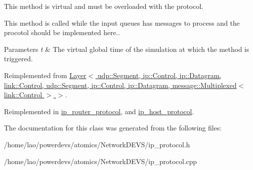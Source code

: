 This method is virtual and must be overloaded with the protocol. 

This method is called while the input queues has messages to process and the procotol should be implemented here..


\begin{DoxyParams}{Parameters}
{\em t} & The virtual global time of the simulation at which the method is triggered. \\
\hline
\end{DoxyParams}


Reimplemented from \hyperlink{classLayer_a1c82b14ba3efc37969f55c633a9b3173}{Layer$<$ udp\+::\+Segment, ip\+::\+Control, ip\+::\+Datagram, link\+::\+Control, udp\+::\+Segment, ip\+::\+Control, ip\+::\+Datagram, message\+::\+Multiplexed$<$ link\+::\+Control $>$ $>$}.



Reimplemented in \hyperlink{classip__router__protocol_a14cf3c7e1418ee8c6035b79626f99438}{ip\+\_\+router\+\_\+protocol}, and \hyperlink{classip__host__protocol_a2e2c43aeb81ae38702b7dec6f7df9227}{ip\+\_\+host\+\_\+protocol}.



The documentation for this class was generated from the following files\+:\begin{DoxyCompactItemize}
\item 
/home/lao/powerdevs/atomics/\+Network\+D\+E\+V\+S/ip\+\_\+protocol.\+h\item 
/home/lao/powerdevs/atomics/\+Network\+D\+E\+V\+S/ip\+\_\+protocol.\+cpp\end{DoxyCompactItemize}
